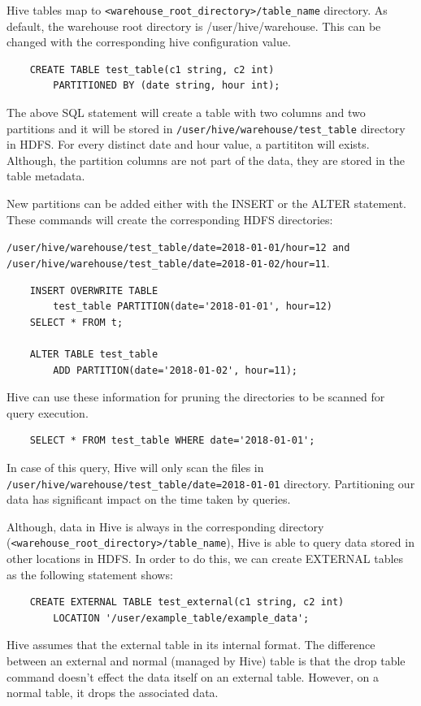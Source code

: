 Hive tables map to \texttt{<warehouse\_root\_directory>/table\_name} directory. As default, the warehouse root directory is /user/hive/warehouse. This can be changed with the corresponding hive configuration value.
\begin{lstlisting}
	CREATE TABLE test_table(c1 string, c2 int) 
		PARTITIONED BY (date string, hour int);
\end{lstlisting}
The above SQL statement will create a table with two columns and two partitions and it will be stored in  \texttt{/user/hive/warehouse/test\_table} directory in HDFS. For every distinct date and hour value, a partititon will exists. Although, the partition columns are not part of the data, they are stored in the table metadata. 

New partitions can be added either with the INSERT or the ALTER statement. These commands will create the corresponding HDFS directories: 

\texttt{/user/hive/warehouse/test\_table/date=2018-01-01/hour=12 and /user/hive/warehouse/test\_table/date=2018-01-02/hour=11}.

\begin{lstlisting}
	INSERT OVERWRITE TABLE
		test_table PARTITION(date='2018-01-01', hour=12)
	SELECT * FROM t;
	
	ALTER TABLE test_table
		ADD PARTITION(date='2018-01-02', hour=11);
\end{lstlisting}

Hive can use these information for pruning the directories to be scanned for query execution. 
\begin{lstlisting}
	SELECT * FROM test_table WHERE date='2018-01-01';
\end{lstlisting}
In case of this query, Hive will only scan the files in \texttt{/user/hive/warehouse/test\_table/date=2018-01-01} directory. Partitioning our data has significant impact on the time taken by queries.

Although, data in Hive is always in the corresponding directory (\texttt{<warehouse\_root\_directory>/table\_name}), Hive is able to query data stored in other locations in HDFS. In order to do this, we can create EXTERNAL tables as the following statement shows:
\begin{lstlisting}
	CREATE EXTERNAL TABLE test_external(c1 string, c2 int)
		LOCATION '/user/example_table/example_data';
\end{lstlisting}
Hive assumes that the external table in its internal format. The difference between an external and normal (managed by Hive) table is that the drop table command doesn't effect the data itself on an external table. However, on a normal table, it drops the associated data.

